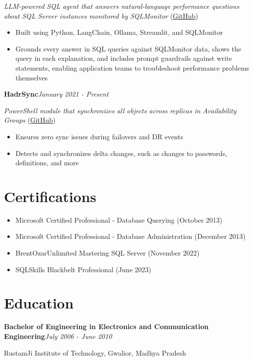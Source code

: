 \documentclass[10pt,a4paper]{article}
\begin{document}
\textit{LLM-powered SQL agent that answers natural-language performance questions about SQL Server instances monitored by SQLMonitor} (\href{https://github.com/imajaydwivedi/SQLMonitor/tree/dev/AI-Agent}{GitHub})
\begin{itemize}
  \item Built using Python, LangChain, Ollama, Streamlit, and SQLMonitor
  \item Grounds every answer in SQL queries against SQLMonitor data, shows the query in each explanation, and includes prompt guardrails against write statements, enabling application teams to troubleshoot performance problems themselves
\end{itemize}
\vspace{14.7pt}
\noindent\textbf{HadrSync}\hfill \textit{January 2021 - Present}

\textit{PowerShell module that synchronizes all objects across replicas in Availability Groups} (\href{https://github.com/imajaydwivedi/HadrSync}{GitHub})
\begin{itemize}
  \item Ensures zero sync issues during failovers and DR events
  \item Detects and synchronizes delta changes, such as changes to passwords, definitions, and more
\end{itemize}

\section{Certifications}
\begin{itemize}
  \item Microsoft Certified Professional - Database Querying (October 2013)
  \item Microsoft Certified Professional - Database Administration (December 2013)
  \item BrentOzarUnlimited Mastering SQL Server (November 2022)
  \item SQLSkills Blackbelt Professional (June 2023)
\end{itemize}

\section{Education}
\noindent\textbf{Bachelor of Engineering in Electronics and Communication Engineering}\hfill \textit{July 2006 - June 2010}

RustamJi Institute of Technology, Gwalior, Madhya Pradesh
\end{document}
